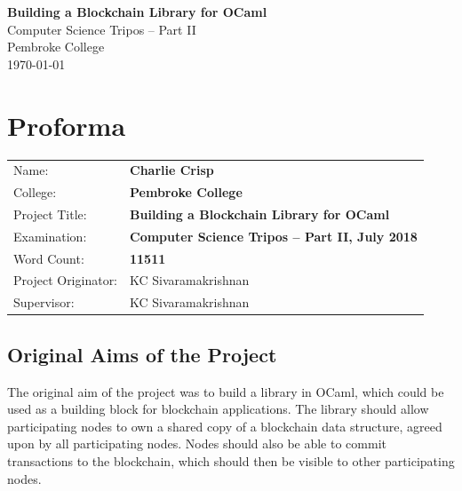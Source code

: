\documentclass[12pt,a4paper,twoside,openright]{report}
\begin{document}
	\pagestyle{empty}
	
	
	\vspace*{60mm}
	\begin{center}
	\Huge
	\textbf{Building a Blockchain Library for OCaml} \\[5mm]
	Computer Science Tripos -- Part II \\[5mm]
	Pembroke College \\[5mm]
	\today  %
	\end{center}
	
	
	\pagestyle{plain}
	
	\chapter*{Proforma}
	
	{\large
	\begin{tabular}{ll}
	Name:               & \bf Charlie Crisp                       \\
	College:            & \bf Pembroke College                     \\
	Project Title:      & \bf Building a Blockchain Library for OCaml \\
	Examination:        & \bf Computer Science Tripos -- Part II, July 2018  \\
	Word Count:         & \bf 11511\\
	Project Originator: & KC Sivaramakrishnan                    \\
	Supervisor:         & KC Sivaramakrishnan                    
	\end{tabular}
	}
	
	
	\section*{Original Aims of the Project}
	
	The original aim of the project was to build a library in OCaml, which could be used as a building block for blockchain applications. 
	The library should allow participating nodes to own a shared copy of a blockchain data structure, agreed upon by all participating nodes.
	Nodes should also be able to commit transactions to the blockchain, which should then be visible to other participating nodes. 
	
\end{document}

